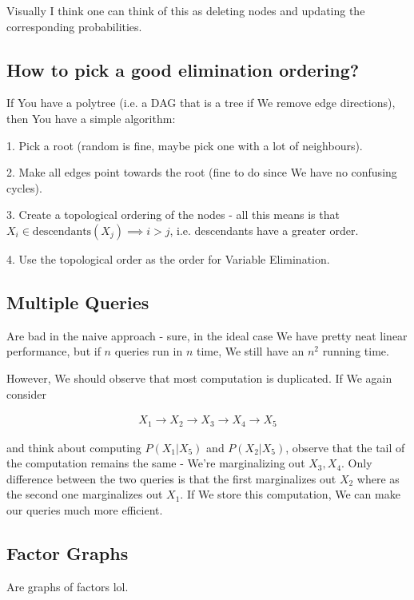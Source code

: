 \documentclass{article}
\begin{document}
		Visually I think one can think of this as deleting nodes and updating the corresponding probabilities.
		
	\subsection{How to pick a good elimination ordering?}
	
		If You have a polytree (i.e. a DAG that is a tree if We remove edge directions), then You have a simple algorithm:
		
		1. Pick a root (random is fine, maybe pick one with a lot of neighbours).
		
		2. Make all edges point towards the root (fine to do since We have no confusing cycles).
		
		3. Create a topological ordering of the nodes - all this means is that $X_i\in \text{descendants}(X_j)\implies i > j$, i.e. descendants have a greater order.
		
		4. Use the topological order as the order for Variable Elimination.
		
	\subsection{Multiple Queries}
	
		Are bad in the naive approach - sure, in the ideal case We have pretty neat linear performance, but if $n$ queries run in $n$ time, We still have an $n^2$ running time.
		
		However, We should observe that most computation is duplicated. If We again consider
		
		\begin{align}
			X_1\to X_2\to X_3\to X_4\to X_5
		\end{align} 
		
		and think about computing $P(X_1|X_5)$ and $P(X_2|X_5)$, observe that the tail of the computation remains the same - We're marginalizing out $X_3, X_4$. Only difference between the two queries is that the first marginalizes out $X_2$ where as the second one marginalizes out $X_1$. If We store this computation, We can make our queries much more efficient.
		
	\subsection{Factor Graphs}
	
		Are graphs of factors lol.
		
\end{document}

